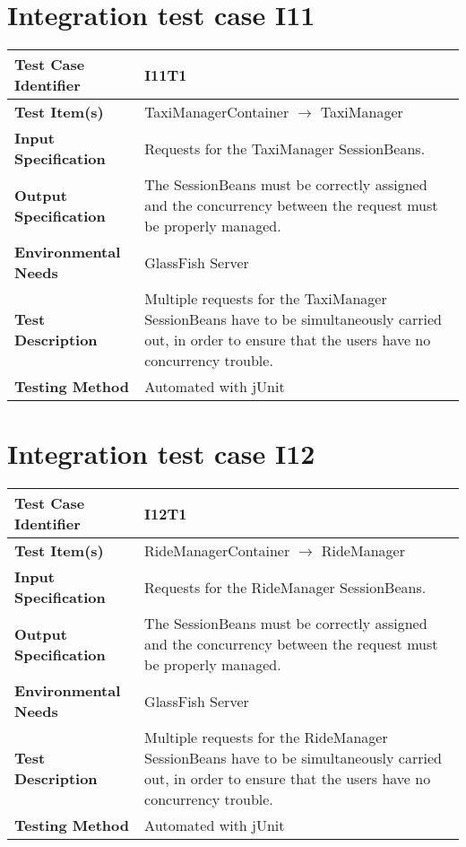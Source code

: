 \vspace{2em}

\section{Integration test case I11}

\begin{tabular}{l p{}}
    \hline
    \textbf{Test Case Identifier} & I11T1\\
    \hline
    \textbf{Test Item(s)} & TaxiManagerContainer $\rightarrow$ TaxiManager \\
    \hline
    \textbf{Input Specification} & Requests for the TaxiManager SessionBeans.\\
    \hline
    \textbf{Output Specification} & The SessionBeans must be correctly assigned and  the concurrency between the request must be properly managed.\\
    \hline
    \textbf{Environmental Needs} & GlassFish Server\\
    \hline
    \textbf{Test Description} & Multiple requests for the TaxiManager SessionBeans have to be simultaneously carried out, in order to ensure that the users have no concurrency trouble.\\
    \hline
    \textbf{Testing Method} & Automated with jUnit \\
    \hline
\end{tabular}

\vspace{2em}

\section{Integration test case I12}

\begin{tabular}{l p{}}
    \hline
    \textbf{Test Case Identifier} & I12T1\\
    \hline
    \textbf{Test Item(s)} & RideManagerContainer $\rightarrow$ RideManager \\
    \hline
    \textbf{Input Specification} & Requests for the RideManager SessionBeans.\\
    \hline
    \textbf{Output Specification} & The SessionBeans must be correctly assigned and  the concurrency between the request must be properly managed.\\
    \hline
    \textbf{Environmental Needs} & GlassFish Server\\
    \hline
    \textbf{Test Description} & Multiple requests for the RideManager SessionBeans have to be simultaneously carried out, in order to ensure that the users have no concurrency trouble.\\
    \hline
    \textbf{Testing Method} & Automated with jUnit \\
    \hline
\end{tabular}

